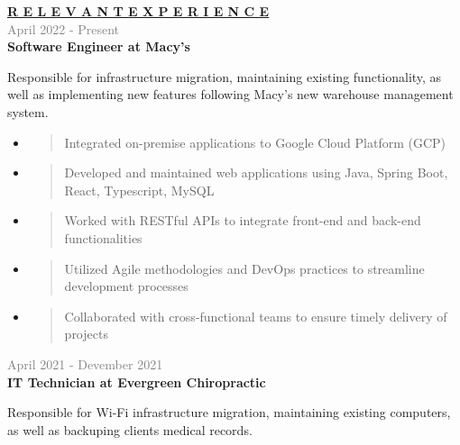 \documentclass[letterpage]{article}
\begin{document}
\begin{minipage}[t]{0.61\linewidth}
\vspace{2pt}
\textbf{\fontsize{14px}{1px}\selectfont
  \ul{R E L E V A N T \:\: E X P E R I E N C E}
}\\

\vspace{7px}
\textcolor{gray}{April 2022 - Present}\\
\textbf{\textsf{Software Engineer at Macy's}}\\
\raggedright
Responsible for infrastructure migration, maintaining existing functionality, as
well as implementing new features following Macy's new warehouse management system.
\begin{itemize}[leftmargin=*,labelindent=1mm,labelsep=0mm]
\item
  \begin{quote}
  \raggedright
  Integrated on-premise applications to Google Cloud Platform (GCP)
  \end{quote}
\item
  \begin{quote}
  \raggedright
  Developed and maintained web applications using Java, Spring Boot, React, Typescript, MySQL
  \end{quote}
\item
  \begin{quote}
  \raggedright
  Worked with RESTful APIs to integrate front-end and back-end functionalities
  \end{quote}
\item
  \begin{quote}
  \raggedright
  Utilized Agile methodologies and DevOps practices to streamline development processes
  \end{quote}
\item
  \begin{quote}
  \raggedright
  Collaborated with cross-functional teams to ensure timely delivery of projects
  \end{quote}
\end{itemize}

\vspace{7px}
\textcolor{gray}{April 2021 - Devember 2021}\\
\textbf{\textsf{IT Technician at Evergreen Chiropractic}}\\
\raggedright
Responsible for Wi-Fi infrastructure migration,
maintaining existing computers, as well as backuping clients medical records.


\end{minipage}
\end{document}
